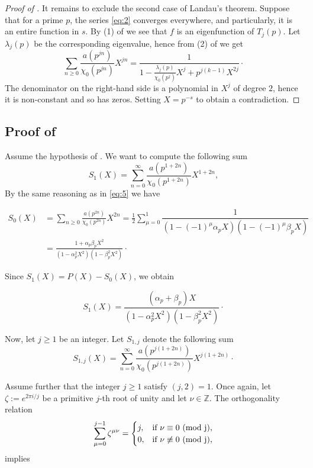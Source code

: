 \documentclass[smallcondensed]{svjour3}
\begin{document}
\begin{proof}[Proof of ]
It remains to exclude the second case of Landau's theorem. Suppose that for a prime $p$, the series \eqref{eq:2} converges everywhere, and particularly, it is an entire function in $s$. By (1) of  we see that $f$ is an eigenfunction of $T_j(p)$. Let $\lambda_j(p)$ be the corresponding eigenvalue, hence from (2) of  we get 
$$
\sum_{n\ge0}\frac{a(p^{jn})}{\chi_{0}(p^{jn})}X^{jn}=\dfrac{1}{1-\frac{\lambda_j(p)}{\chi_{0}(p^{j})}X^{j}+p^{j(k-1)}X^{2j}}\cdot
$$
The denominator on the right-hand side is a polynomial in $X^j$ of degree $2$, hence
it is non-constant and so has zeros. Setting $X=p^{-s}$ to obtain a contradiction.

\end{proof}

\subsection{Proof of \texorpdfstring{}{Theorem 3}}

Assume the hypothesis of . We want  to compute the following sum
$$
S_{1}(X)=\sum_{n=0}^{\infty}\frac{a(p^{1+2 n})}{\chi_{0}(p^{1+2 n})}X^{1+2 n},
$$
By the same reasoning as in \eqref{eq:5} we have

\begin{align}
S_{0}(X)&=\sum_{n\ge0}\frac{a(p^{2 n})}{\chi_{0}(p^{2 n})}X^{2 n}=\frac{1}{2}\sum_{\mu=0}^{1}\dfrac{1}{(1-(-1)^{\mu}\alpha_p X)(1-(-1)^{\mu}\beta_p X)}\\
&=\frac{1+\alpha_{p}\beta_{p}X^{2}}{\left(1-\alpha_{p}^{2}X^{2}\right)\left(1-\beta_{p}^{2}X^{2}\right)}\cdot\label{eq,45}
\end{align}

Since $S_{1}(X)=P(X)-S_{0}(X)$, we obtain

\begin{equation}
S_{1}(X)=\frac{(\alpha_{p}+\beta_{p})X}{(1-\alpha_{p}^{2}X^{2})(1-\beta_{p}^{2}X^{2})}\cdot\label{eq,42}
\end{equation}

Now, let $j\ge1$ be an integer. Let $S_{1,j}$ denote the following sum
\begin{equation}
S_{1,j}(X)=\sum_{n=0}^{\infty}\frac{a(p^{j(1+2 n)})}{\chi_{0}(p^{j(1+2 n)})}X^{j(1+2 n)}\cdot\label{eq,52}
\end{equation}

Assume further that the integer $j\geq 1$ satisfy $(j,2)=1$. Once again, let $\zeta:=e^{2\pi i/j}$ be a primitive $j$-th root of unity and let $\nu\in{\mathbb Z}$. The orthogonality relation
\begin{displaymath}
\sum_{\mu=0}^{j-1}\zeta^{\mu\nu}=
\begin{cases}
j, & \text{if $\nu\equiv 0$ {\rm (mod j),}}\\
0, & \text{if $\nu\not\equiv 0$ {\rm (mod j),}}
\end{cases}
\end{displaymath}
implies
\end{document}

